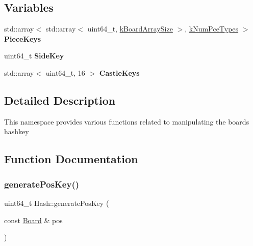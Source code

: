 \subsection*{Variables}
\begin{DoxyCompactItemize}
\item 
\mbox{\label{namespaceHash_aff162a90408333f82a32806c4792a88d}} 
std\+::array$<$ std\+::array$<$ uint64\+\_\+t, \mbox{\hyperlink{constants_8h_a828392e3517e7bf6895696199c7fdf4f}{k\+Board\+Array\+Size}} $>$, \mbox{\hyperlink{constants_8h_a65fd654c96b3bb6b2e3f2e5c2d5bb09c}{k\+Num\+Pce\+Types}} $>$ {\bfseries Piece\+Keys}
\item 
\mbox{\label{namespaceHash_a5ed567a4d8542636dde31ae4f3d95e28}} 
uint64\+\_\+t {\bfseries Side\+Key}
\item 
\mbox{\label{namespaceHash_a961bf38be4a9f19f3fb39cb731cefadb}} 
std\+::array$<$ uint64\+\_\+t, 16 $>$ {\bfseries Castle\+Keys}
\end{DoxyCompactItemize}


\subsection{Detailed Description}
This namespace provides various functions related to manipulating the board\textquotesingle{}s hashkey 

\subsection{Function Documentation}
\mbox{\label{namespaceHash_ac97f6604fcb1ad14616b2617e6bae967}} 
\subsubsection{\texorpdfstring{generate\+Pos\+Key()}{generatePosKey()}}
{\footnotesize\ttfamily uint64\+\_\+t Hash\+::generate\+Pos\+Key (\begin{DoxyParamCaption}\item[{const \mbox{\hyperlink{classBoard}{Board}} \&}]{pos }\end{DoxyParamCaption})}



